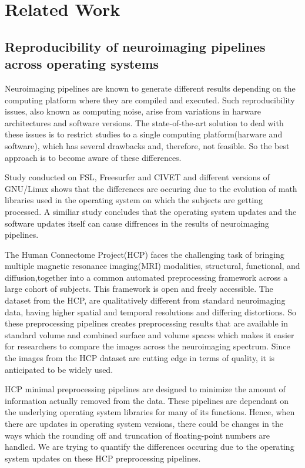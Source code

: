 \chapter{Related Work}

\section{Reproducibility of neuroimaging pipelines across operating systems}
Neuroimaging pipelines are known to generate different results depending on the computing platform where they are compiled and executed. \cite{Gla15} Such reproducibility issues, also known as computing noise, arise from variations in harware architectures and software versions. The state-of-the-art solution to deal with these issues is to restrict studies to a single computing platform(harware and software), which has several drawbacks and, therefore, not feasible. So the best approach is to become aware of these differences.

Study conducted on FSL, Freesurfer and CIVET and different versions of GNU/Linux \cite{Gla15} shows that the differences are occuring due to the evolution of math libraries used in the operating system on which the subjects are getting processed. A similiar study \cite{10.1371/journal.pone.0038234} concludes that the operating system updates and the software updates itself can cause diffrences in the results of neuroimaging pipelines.
 
The Human Connectome Project(HCP) faces the challenging task of bringing multiple magnetic resonance imaging(MRI) modalities, structural, functional, and diffusion,together into a common automated preprocessing framework across a large cohort of subjects. This framework is open and freely accessible. \cite{Gla13} The dataset from the HCP, are qualitatively different from standard neuroimaging data, having higher spatial and temporal resolutions and differing distortions. So these preprocessing pipelines creates preprocessing results that are available in standard volume and combined surface and volume spaces which makes it easier for researchers to compare the images across the neuroimaging spectrum. Since the images from the HCP dataset are cutting edge in terms of quality, it is anticipated to be widely used. 

HCP minimal preprocessing pipelines are designed to minimize the amount of information actually removed from the data. These pipelines are dependant on the underlying operating system libraries for many of its functions. Hence, when there are updates in operating system versions, there could be changes in the ways which the rounding off and truncation of floating-point numbers are handled. We are trying to quantify the differences occuring due to the operating system updates on these HCP preprocessing pipelines.  

